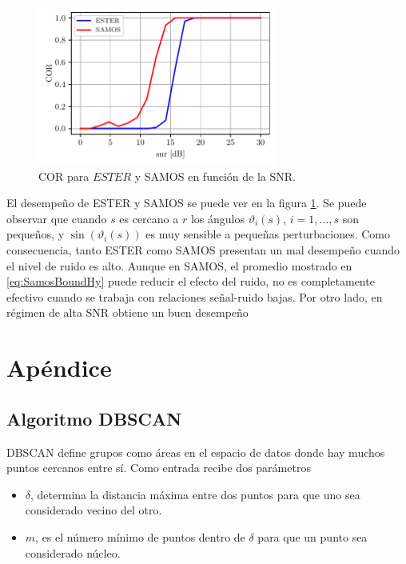 \begin{figure}[ht]
	\centering
	\includegraphics[width = 0.7\textwidth]{Figuras/COR_ESTER_SAMOS_pruebas.pdf}
	\caption{COR para $ESTER$ y SAMOS en función de la SNR.}
	\label{fig:COR_example_SAMOS_ESTER}
\end{figure}

El desempeño de ESTER y SAMOS se puede ver en la figura \ref{fig:COR_example_SAMOS_ESTER}. Se puede observar que cuando $s$ es cercano a $r$ los ángulos $\vartheta_i(s)$, $i=1,\ldots,s$ son pequeños, y $\sin(\vartheta_i(s))$ es muy sensible a pequeñas perturbaciones. Como consecuencia, tanto ESTER como SAMOS presentan un mal desempeño cuando el nivel de ruido es alto. Aunque en SAMOS, el promedio mostrado en \eqref{eq:SamosBoundHy} puede reducir el efecto del ruido, no es completamente efectivo cuando se trabaja con relaciones señal-ruido bajas. Por otro lado, en régimen de alta SNR obtiene un buen desempeño  




\newpage
\section{Apéndice}
\subsection{Algoritmo DBSCAN}

	DBSCAN define grupos como áreas en el espacio de datos donde hay muchos puntos cercanos entre sí. Como entrada recibe dos parámetros 
	\begin{itemize}
		\item $\delta$, determina la distancia máxima entre dos puntos para que uno sea considerado vecino del otro.
		\item $m$, es el número mínimo de puntos dentro de $\delta$ para que un punto sea considerado núcleo.
	\end{itemize}
	
